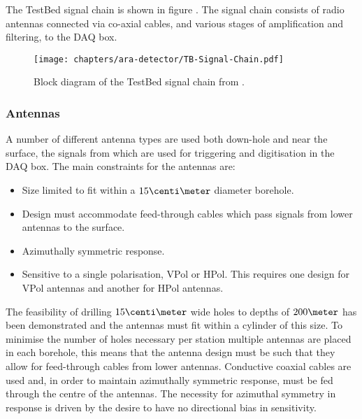 The TestBed signal chain is shown in figure . The signal chain consists of radio antennas connected via co-axial cables, and various stages of amplification and filtering, to the DAQ box.

\begin{figure}[htpb]
  \centering
  \texttt{[image: chapters/ara-detector/TB-Signal-Chain.pdf]}
  \caption{Block diagram of the TestBed signal chain from \cite{Allison2012457}.}
  \label{fig:ara-detector:TestBed:Signal-Chain}
\end{figure}

\subsubsection{Antennas}
\label{sec:ara-detector:TestBed:Antennas}


A number of different antenna types are used both down-hole and near the surface, the signals from which are used for triggering and digitisation in the DAQ box. The main constraints for the antennas are:

\begin{itemize}
\item Size limited to fit within a $15 \centi \meter$ diameter borehole.
\item Design must accommodate feed-through cables which pass signals from lower antennas to the surface.
\item Azimuthally symmetric response.
\item Sensitive to a single polarisation, VPol or HPol. This requires one design for VPol antennas and another for HPol antennas.
\end{itemize}

The feasibility of drilling $15 \centi\meter$ wide holes to depths of $200 \meter$ has been demonstrated and the antennas must fit within a cylinder of this size. To minimise the number of holes necessary per station multiple antennas are placed in each borehole, this means that the antenna design must be such that they allow for feed-through cables from lower antennas. Conductive coaxial cables are used and, in order to maintain azimuthally symmetric response, must be fed through the centre of the antennas. The necessity for azimuthal symmetry in response is driven by the desire to have no directional bias in sensitivity. 

